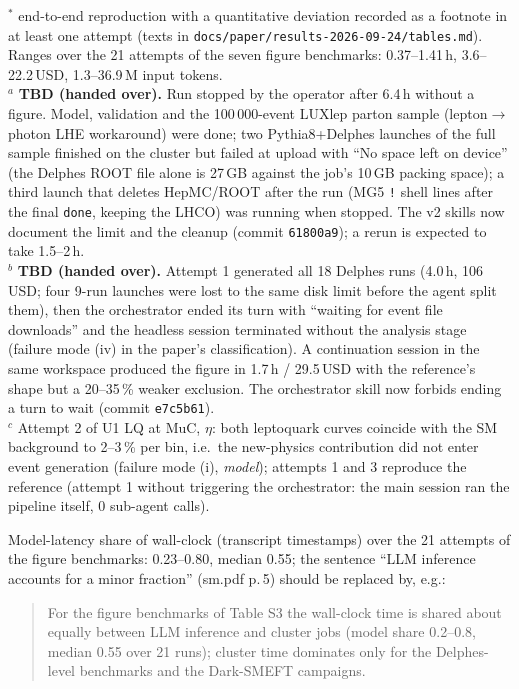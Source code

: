 \documentclass[11pt]{article}
\begin{document}
\noindent$^{*}$ end-to-end reproduction with a quantitative deviation recorded as a footnote in at least one attempt
(texts in \texttt{docs/paper/results-2026-09-24/tables.md}). Ranges over the 21 attempts of the seven figure benchmarks:
0.37--1.41\,h, 3.6--22.2\,USD, 1.3--36.9\,M input tokens.\\
$^{a}$ \textbf{TBD (handed over).} Run stopped by the operator after 6.4\,h without a figure. Model, validation and the
100\,000-event LUXlep parton sample (lepton$\to$photon LHE workaround) were done; two Pythia8+Delphes launches of the
full sample finished on the cluster but failed at upload with ``No space left on device'' (the Delphes ROOT file alone is
27\,GB against the job's 10\,GB packing space); a third launch that deletes HepMC/ROOT after the run (MG5 \texttt{!} shell
lines after the final \texttt{done}, keeping the LHCO) was running when stopped. The v2 skills now document the limit and
the cleanup (commit \texttt{61800a9}); a rerun is expected to take 1.5--2\,h.\\
$^{b}$ \textbf{TBD (handed over).} Attempt 1 generated all 18 Delphes runs (4.0\,h, 106\,USD; four 9-run launches were lost
to the same disk limit before the agent split them), then the orchestrator ended its turn with ``waiting for event file
downloads'' and the headless session terminated without the analysis stage (failure mode (iv) in the paper's
classification). A continuation session in the same workspace produced the figure in 1.7\,h / 29.5\,USD with the reference's
shape but a 20--35\,\% weaker exclusion. The orchestrator skill now forbids ending a turn to wait (commit \texttt{e7c5b61}).\\
$^{c}$ Attempt 2 of U1 LQ at MuC, $\eta$: both leptoquark curves coincide with the SM background to 2--3\,\% per bin, i.e.\
the new-physics contribution did not enter event generation (failure mode (i), \emph{model}); attempts 1 and 3 reproduce the
reference (attempt 1 without triggering the orchestrator: the main session ran the pipeline itself, 0 sub-agent calls).

Model-latency share of wall-clock (transcript timestamps) over the 21 attempts of the figure benchmarks: 0.23--0.80,
median 0.55; the sentence ``LLM inference accounts for a minor fraction'' (sm.pdf p.\,5) should be replaced by, e.g.:
\begin{quote}
For the figure benchmarks of Table S3 the wall-clock time is shared about equally between LLM inference and cluster jobs
(model share 0.2--0.8, median 0.55 over 21 runs); cluster time dominates only for the Delphes-level benchmarks and the
Dark-SMEFT campaigns.
\end{quote}
\end{document}
